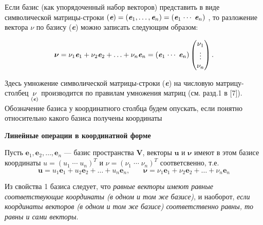 \documentclass[10pt]{book}
\begin{document}
    \small{Если базис (как упорядоченный набор векторов) представить в виде символической матрицы-строки
    $(\textit{\textbf{e}})=(\textit{\textbf{e}}_1,\dots,\textit{\textbf{e}}_n)=(\textit{\textbf{e}}_{1}\;\dotsi\;\textit{\textbf{e}}_n)$ , то разложение вектора \textbf{\textit{\boldmath $\nu$}} по базису (\textit{\textbf{e}}) можно записать следующим образом:

    $$\bm{\nu}=\nu_{1}\textit{\textbf{e}}_{1}+\nu_{2}\textit{\textbf{e}}_{2}+\dotsc+\nu_{n}\textit{\textbf{e}}_{n}=(\textit{\textbf{e}}_{1}\;\dotsi\;\textit{\textbf{e}}_{n})
    \begin{pmatrix}
    \nu_1 \\
    \vdots \\
    \nu_n \\
    \end{pmatrix}\text{.}$$

    \noindent Здесь умножение символической матрицы-строки (\textit{\textbf{e}}) на числовую матрицу-столбец $\underset{(\textit{\textbf{e}})}{\nu}$ производится по правилам умножения матриц (см. разд.1 в [7]). Обозначение базиса у координатного столбца будем опускать, если понятно относительно какого базиса получены координаты\par

    \begin{center}
        \textbf{Линейные операции в координатной форме}
    \end{center}

    Пусть $\mathbf{e}_1,\mathbf{e}_2,\dots,\mathbf{e}_n$ --- базис пространства $\mathbf{V}$, векторы $\mathbf{u}$ и $\mathbf{\nu}$ имеют в этом базисе координаты $u=(u_{1}\;\dotsi\;u_{n})^\mathit{T}$ и $\nu=(\nu_{1}\;\dotsi\;\nu_{n})^\mathit{T}$ соответсвенно, т.е.$$\mathbf{u}=u_{1}\mathbf{e}_{1}+u_{2}\mathbf{e}_{2}+\dotsc+u_{n}\mathbf{e}_{n}\text{,}\qquad\mathbf{\nu}=\nu_{1}\mathbf{e}_{1}+\nu_{2}\mathbf{e}_{2}+\dotsc+\nu_{n}\mathbf{e}_{n}$$\par

    Из свойства 1 базиса следует, что \textit{равные векторы имеют равные соответствующие
    координаты (в одном и том же базисе)}, и наоборот, \textit{если координаты векторов (в одном и
    том же базисе) соответственно равны, то равны и сами векторы}.\par

}
\end{document}
